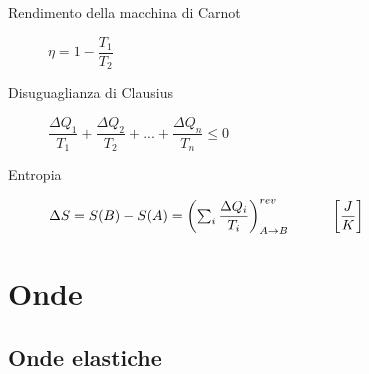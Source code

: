 \documentclass[a4paper,11pt,italian]{article}
\begin{document}
\begin{description}
  \item[Rendimento della macchina di Carnot] 
  $ \eta = 1 - \dfrac{T_1}{T_2} $

  \item[Disuguaglianza di Clausius] 
  $ \dfrac{\Delta Q_1}{T_1} + \dfrac{\Delta Q_2}{T_2} + ... + \dfrac{\Delta Q_n}{T_n} \leq 0  $

  \item[Entropia]
  $ \Delta S = S(B) - S(A) = \left( \sum_i \dfrac{\Delta Q_i}{T_i} \right)^{rev}_{A \rightarrow B} \hspace*{3em} \left[ \dfrac{J}{K} \right]$
%   
%   
%
\end{description}


\newpage
\section{Onde}

\subsection{Onde elastiche}
\end{document}
